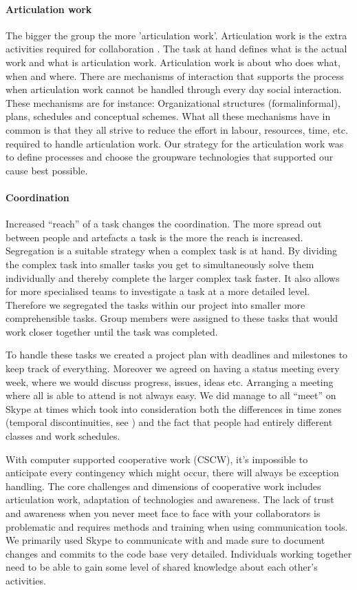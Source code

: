 \paragraph{Articulation work} \label{par:articulationwork}
The bigger the group the more 'articulation work'. Articulation work is the extra activities required for collaboration \cite{schmidt1992taking}. The task at hand defines what is the actual work and what is articulation work. Articulation work is about who does what, when and where. There are mechanisms of interaction that supports the process when articulation work cannot be handled through every day social interaction. These mechanisms are for instance: Organizational structures (formal\/informal), plans, schedules and conceptual schemes. What all these mechanisms have in common is that they all strive to reduce the effort in labour, resources, time, etc. required to handle articulation work. Our strategy for the articulation work was to define processes and choose the groupware technologies that supported our cause best possible. 

\paragraph{Coordination} \label{par:coordination}
Increased ``reach'' of a task changes the coordination. The more spread out between people and artefacts a task is the more the reach is increased. Segregation is a suitable strategy when a complex task is at hand. By dividing the complex task into smaller tasks you get to simultaneously solve them individually and thereby complete the larger complex task faster. It also allows for more specialised teams to investigate a task at a more detailed level. Therefore we segregated the tasks within our project into smaller more comprehensible tasks. Group members were assigned to these tasks that would work closer together until the task was completed. 

To handle these tasks we created a project plan with deadlines and milestones to keep track of everything. Moreover we agreed on having a status meeting every week, where we would discuss progress, issues, ideas etc. Arranging a meeting where all is able to attend is not always easy. We did manage to all ``meet'' on Skype at times which took into consideration both the differences in time zones (temporal discontinuities, see ) and the fact that people had entirely different classes and work schedules.

With computer supported cooperative work (CSCW), it's impossible to anticipate every contingency which might occur, there will always be exception handling. The core challenges and dimensions of cooperative work includes articulation work, adaptation of technologies and awareness. The lack of trust and awareness when you never meet face to face with your collaborators is problematic and requires methods and training when using communication tools. We primarily used Skype to communicate with and made sure to document changes and commits to the code base very detailed. Individuals working together need to be able to gain some level of shared knowledge about each other's activities.


